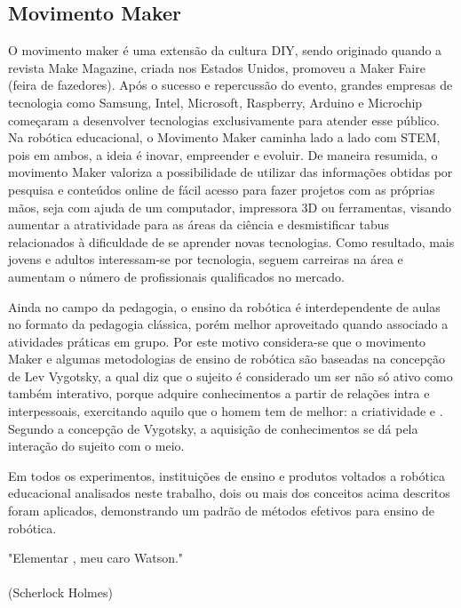 \subsection{Movimento Maker}\label{sec:maker} 
O movimento maker é uma extensão da cultura DIY, sendo originado quando a revista Make Magazine, criada nos Estados Unidos, promoveu a Maker Faire (feira de fazedores). Após o sucesso e repercussão do evento, grandes empresas de tecnologia como Samsung, Intel, Microsoft, Raspberry, Arduino e Microchip começaram a desenvolver tecnologias exclusivamente para atender esse público. Na robótica educacional, o Movimento Maker caminha lado a lado com STEM, pois em ambos, a ideia é inovar, empreender e evoluir. De maneira resumida, o movimento Maker valoriza a possibilidade de utilizar das informações obtidas por pesquisa e conteúdos online de fácil acesso para fazer projetos com as próprias mãos, seja com ajuda de um computador, impressora 3D ou ferramentas, visando aumentar a
atratividade para as áreas da ciência e desmistificar tabus relacionados à dificuldade de se aprender novas tecnologias. Como resultado, mais jovens e adultos interessam-se por tecnologia, seguem carreiras na área e aumentam o número de
profissionais qualificados no mercado.

Ainda no campo da pedagogia, o ensino da robótica é interdependente de
aulas no formato da pedagogia clássica, porém melhor aproveitado quando associado a atividades práticas em grupo. Por este motivo considera-se que o movimento Maker e algumas metodologias de ensino de robótica são baseadas na concepção de Lev Vygotsky, a qual diz que o sujeito é considerado um ser não só ativo como também interativo, porque adquire conhecimentos a partir de relações intra e interpessoais, exercitando aquilo que o homem tem de melhor: a criatividade \cite{palangana} e \cite{rocha}. 
Segundo a concepção de Vygotsky, a aquisição de conhecimentos se dá pela interação do sujeito com o meio.



Em todos os experimentos, instituições de ensino e produtos voltados a robótica educacional  analisados neste trabalho, dois ou mais dos conceitos acima descritos foram aplicados, demonstrando um padrão de métodos efetivos para ensino de robótica.


\begin{flushright}
	"Elementar , meu caro Watson." \\
	\ \\
	(Scherlock Holmes)
\end{flushright}

